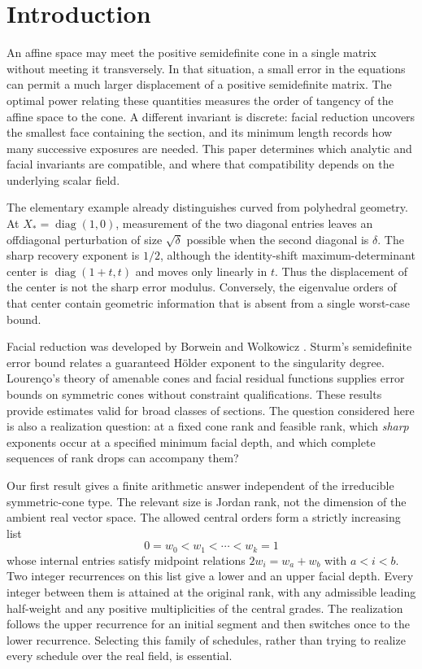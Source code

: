 \section{Introduction}
An affine space may meet the positive semidefinite cone in a single matrix without meeting it transversely. In that situation, a small error in the equations can permit a much larger displacement of a positive semidefinite matrix. The optimal power relating these quantities measures the order of tangency of the affine space to the cone. A different invariant is discrete: facial reduction uncovers the smallest face containing the section, and its minimum length records how many successive exposures are needed. This paper determines which analytic and facial invariants are compatible, and where that compatibility depends on the underlying scalar field.

The elementary example already distinguishes curved from polyhedral geometry. At $X_*=\operatorname{diag}(1,0)$, measurement of the two diagonal entries leaves an offdiagonal perturbation of size $\sqrt{\delta}$ possible when the second diagonal is $\delta$. The sharp recovery exponent is $1/2$, although the identity-shift maximum-determinant center is $\operatorname{diag}(1+t,t)$ and moves only linearly in $t$. Thus the displacement of the center is not the sharp error modulus. Conversely, the eigenvalue orders of that center contain geometric information that is absent from a single worst-case bound.

Facial reduction was developed by Borwein and Wolkowicz \cite{BW81}. Sturm's semidefinite error bound \cite{Sturm00} relates a guaranteed H\"older exponent to the singularity degree. Louren\c co's theory of amenable cones and facial residual functions \cite{Lourenco21} supplies error bounds on symmetric cones without constraint qualifications. These results provide estimates valid for broad classes of sections. The question considered here is also a realization question: at a fixed cone rank and feasible rank, which \emph{sharp} exponents occur at a specified minimum facial depth, and which complete sequences of rank drops can accompany them?

Our first result gives a finite arithmetic answer independent of the irreducible symmetric-cone type. The relevant size is Jordan rank, not the dimension of the ambient real vector space. The allowed central orders form a strictly increasing list
\[
0=w_0<w_1<\cdots<w_k=1
\]
whose internal entries satisfy midpoint relations $2w_i=w_a+w_b$ with $a<i<b$. Two integer recurrences on this list give a lower and an upper facial depth. Every integer between them is attained at the original rank, with any admissible leading half-weight and any positive multiplicities of the central grades. The realization follows the upper recurrence for an initial segment and then switches once to the lower recurrence. Selecting this family of schedules, rather than trying to realize every schedule over the real field, is essential.

